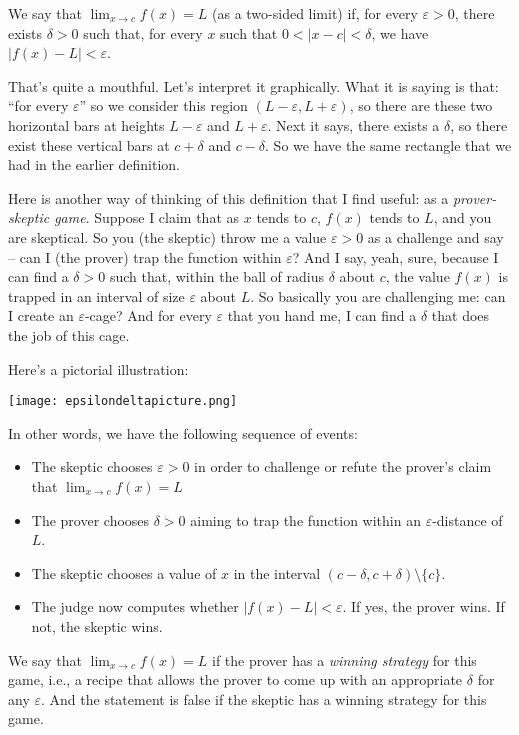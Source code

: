 \documentclass[10pt]{amsart}
\begin{document}
We say that $\lim_{x \to c} f(x) = L$ (as a two-sided limit) if, for
every $\varepsilon > 0$, there exists $\delta > 0$ such that, for every
$x$ such that $0 < |x - c| < \delta$, we have $|f(x) - L| < \varepsilon$.

That's quite a mouthful. Let's interpret it graphically. What it
is saying is that: ``for every $\varepsilon$'' so we consider this region
$(L - \varepsilon, L + \varepsilon)$, so there are these two horizontal bars
at heights $L - \varepsilon$ and $L + \varepsilon$. Next it says, there
exists a $\delta$, so there exist these vertical bars at $c + \delta$
and $c - \delta$. So we have the same rectangle that we had in the
earlier definition.

Here is another way of thinking of this definition that I find useful:
as a {\em prover-skeptic game}. Suppose I claim that as $x$ tends to
$c$, $f(x)$ tends to $L$, and you are skeptical. So you (the skeptic)
throw me a value $\varepsilon > 0$ as a challenge and say -- can I (the
prover) trap the function within $\varepsilon$? And I say, yeah, sure,
because I can find a $\delta > 0$ such that, within the ball of radius
$\delta$ about $c$, the value $f(x)$ is trapped in an interval of size
$\varepsilon$ about $L$. So basically you are challenging me: can I
create an $\varepsilon$-cage? And for every $\varepsilon$ that you hand me,
I can find a $\delta$ that does the job of this cage.

Here's a pictorial illustration:

\texttt{[image: epsilondeltapicture.png]}

In other words, we have the following sequence of events:

\begin{itemize}
\item The skeptic chooses $\varepsilon > 0$ in order to challenge or
  refute the prover's claim that $\lim_{x \to c} f(x) = L$
\item The prover chooses $\delta > 0$ aiming to trap the function
  within an $\varepsilon$-distance of $L$.
\item The skeptic chooses a value of $x$ in the interval $(c -
  \delta,c+\delta) \setminus \{ c \}$.
\item The judge now computes whether $|f(x) - L| < \varepsilon$. If yes,
  the prover wins. If not, the skeptic wins.
\end{itemize}

We say that $\lim_{x \to c} f(x) = L$ if the prover has a {\em winning
strategy} for this game, i.e., a recipe that allows the prover to come
up with an appropriate $\delta$ for any $\varepsilon$. And the statement
is false if the skeptic has a winning strategy for this game.
\end{document}
